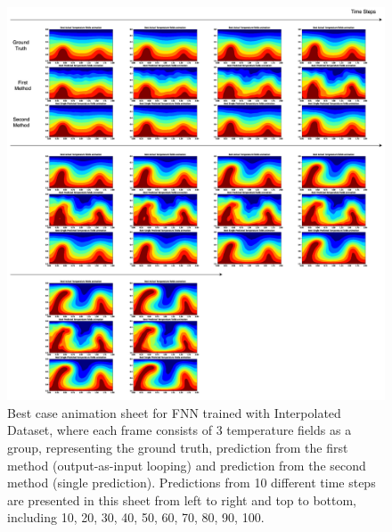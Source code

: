 {\begin{itemize}
\end{itemize}

\begin{figure}[H]
    \centering
    \includegraphics[width=0.9\linewidth]{figures/FNN_animation_sheet.png}
    \caption{Best case animation sheet for FNN trained with Interpolated Dataset, where each frame consists of 3 temperature fields as a group, representing the ground truth, prediction from the first method (output-as-input looping) and prediction from the second method (single prediction). Predictions from 10 different time steps are presented in this sheet from left to right and top to bottom, including 10, 20, 30, 40, 50, 60, 70, 80, 90, 100.}
\end{figure}

}

